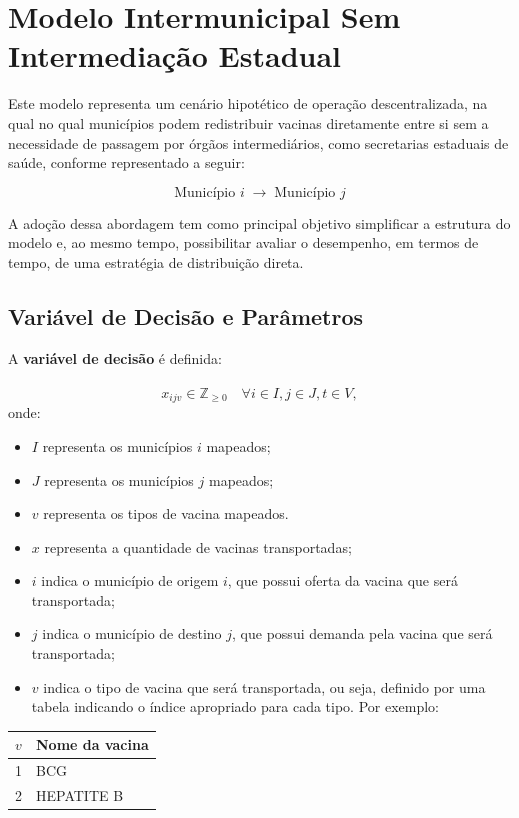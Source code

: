 \section{Modelo Intermunicipal Sem Intermediação Estadual}

Este modelo representa um cenário hipotético de operação descentralizada, na qual no qual municípios podem redistribuir vacinas diretamente entre si sem a necessidade de passagem por órgãos intermediários, como secretarias estaduais de saúde, conforme representado a seguir:

\[
\text{Município } i \;\longrightarrow\; \text{Município } j
\]

A adoção dessa abordagem tem como principal objetivo simplificar a estrutura do modelo e, ao mesmo tempo, possibilitar avaliar o desempenho, em termos de tempo, de uma estratégia de distribuição direta.

\subsection{Variável de Decisão e Parâmetros}

A \textbf{variável de decisão} é definida:
\\
\\
\begin{equation*}
    x_{ijv} \in \mathbb{Z}_{\geq 0} \quad \forall i \in I, j \in J, t \in V,
\end{equation*}
onde:
\begin{itemize}
    \item $I$ representa os municípios $i$ mapeados;
    \item $J$ representa os municípios $j$ mapeados;
    \item $v$ representa os tipos de vacina mapeados.
    \item $x$ representa a quantidade de vacinas transportadas;
    \item $i$ indica o município de origem $i$, que possui oferta da vacina que será transportada;
    \item $j$ indica o município de destino $j$, que possui demanda pela vacina que será transportada;
    \item $v$ indica o tipo de vacina que será transportada, ou seja, definido por uma tabela indicando o índice apropriado para cada tipo. Por exemplo:
\end{itemize}

\begin{quadro}[htb] 
\centering
\caption{Exemplo de uso da variável $v$}
\label{quad:quadro1}
\begin{tabular}{|c|l|} 
\hline
\textbf{$v$} & \textbf{Nome da vacina} \\
\hline
1 & BCG \\
\hline
2 & HEPATITE B \\
\hline
\end{tabular}
\end{quadro}

